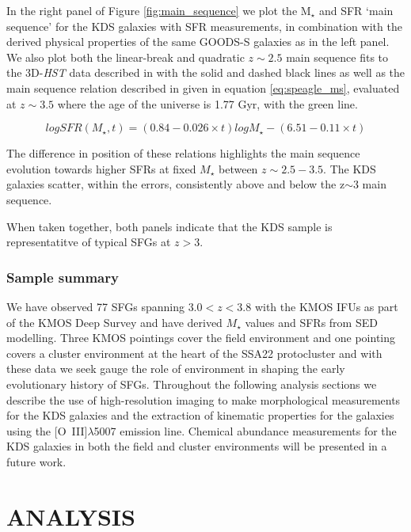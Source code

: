 \documentclass[fleqn,usenatbib]{mn2e}
\begin{document}
In the right panel of Figure \ref{fig:main_sequence} we plot the M$_{\star}$ and SFR `main sequence' for the KDS galaxies with SFR measurements, in combination with the derived physical properties of the same GOODS-S galaxies as in the left panel.
We also plot both the linear-break and quadratic $z\sim 2.5$ main sequence fits to the 3D-{\em HST} data described in \cite{Whitaker2014} with the solid and dashed black lines as well as the main sequence relation described in \cite{Speagle2014} given in equation \ref{eq:speagle_ms}, evaluated at $z\sim3.5$ where the age of the universe is 1.77 Gyr, with the green line.

\begin{equation}\label{eq:speagle_ms}
logSFR(M_{\star}, t) = (0.84 - 0.026 \times t)logM_{\star} - (6.51 - 0.11 \times t)
\end{equation}

The difference in position of these relations highlights the main sequence evolution towards higher SFRs at fixed $M_{\star}$ between $z\sim2.5-3.5$.
The KDS galaxies scatter, within the errors, consistently above and below the z$\sim3$ main sequence.

When taken together, both panels indicate that the KDS sample is representatitve of typical SFGs at $z>3$.

\subsubsection{Sample summary}\label{subsubsec:sample_summary}
We have observed 77 SFGs spanning $3.0 < z < 3.8$ with the KMOS IFUs as part of the KMOS Deep Survey and have derived $M_{\star}$ values and SFRs from SED modelling.
Three KMOS pointings cover the field environment and one pointing covers a cluster environment at the heart of the SSA22 protocluster and with these data we seek gauge the role of environment in shaping the early evolutionary history of SFGs.
Throughout the following analysis sections we describe the use of high-resolution imaging to make morphological measurements for the KDS galaxies and the extraction of kinematic properties for the galaxies using the [O~{\sc III}]$\lambda$5007 emission line.
Chemical abundance measurements for the KDS galaxies in both the field and cluster environments will be presented in a future work.

\section{ANALYSIS}\label{sec:analysis}
\end{document}
